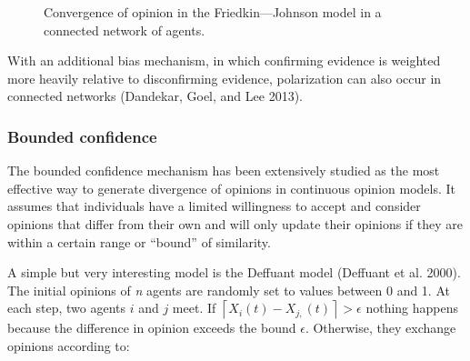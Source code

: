 \documentclass[
  a4paper,
  DIV=11,
  numbers=noendperiod,
  oneside]{scrreprt}
\begin{document}
\begin{figure}


\caption{\label{fig-ch7-img7-old-95}Convergence of opinion in the
Friedkin---Johnson model in a connected network of agents.}

\end{figure}%

With an additional bias mechanism, in which confirming evidence is
weighted more heavily relative to disconfirming evidence, polarization
can also occur in connected networks (Dandekar, Goel, and Lee 2013).

\subsubsection{Bounded confidence}\label{sec-Bounded-confidence}

The bounded confidence mechanism has been extensively studied as the
most effective way to generate divergence of opinions in continuous
opinion models. It assumes that individuals have a limited willingness
to accept and consider opinions that differ from their own and will only
update their opinions if they are within a certain range or ``bound'' of
similarity.

A simple but very interesting model is the Deffuant model (Deffuant et
al. 2000). The initial opinions of \emph{n} agents are randomly set to
values between 0 and 1. At each step, two agents \(i\) and \(j\) meet.
If \(\left\lceil X_{i}(t) - X_{j,}(t) \right\rceil > \epsilon\) nothing
happens because the difference in opinion exceeds the bound
\(\epsilon\). Otherwise, they exchange opinions according to:
\end{document}
